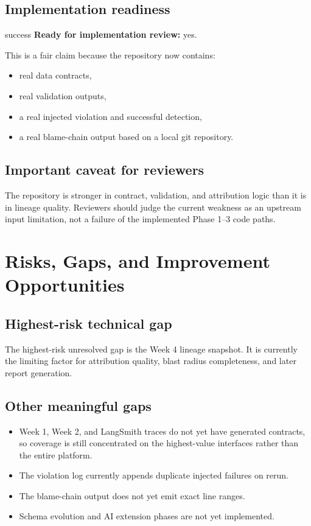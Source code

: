 \documentclass[11pt]{report}
\begin{document}
\section{Implementation readiness}
\begin{statusbox}{success}
\textbf{Ready for implementation review:} yes.
\end{statusbox}

This is a fair claim because the repository now contains:
\begin{itemize}[leftmargin=1.5em]
  \item real data contracts,
  \item real validation outputs,
  \item a real injected violation and successful detection,
  \item a real blame-chain output based on a local git repository.
\end{itemize}

\section{Important caveat for reviewers}
The repository is stronger in contract, validation, and attribution logic than it is in lineage quality. Reviewers should judge the current weakness as an upstream input limitation, not a failure of the implemented Phase 1--3 code paths.

\clearpage
\chapter{Risks, Gaps, and Improvement Opportunities}

\section{Highest-risk technical gap}
The highest-risk unresolved gap is the Week 4 lineage snapshot. It is currently the limiting factor for attribution quality, blast radius completeness, and later report generation.

\section{Other meaningful gaps}
\begin{itemize}[leftmargin=1.5em]
  \item Week 1, Week 2, and LangSmith traces do not yet have generated contracts, so coverage is still concentrated on the highest-value interfaces rather than the entire platform.
  \item The violation log currently appends duplicate injected failures on rerun.
  \item The blame-chain output does not yet emit exact line ranges.
  \item Schema evolution and AI extension phases are not yet implemented.
\end{itemize}
\end{document}
